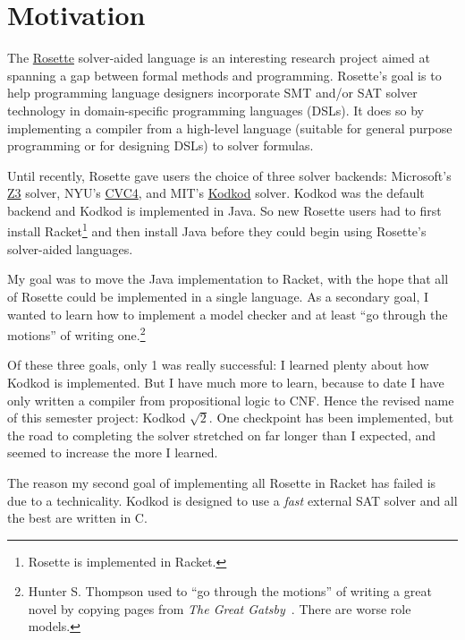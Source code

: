 \section{Motivation}
\label{sec:motivation}

The \href{https://emina.github.io/rosette/}{Rosette} solver-aided language
 is an interesting research project aimed at spanning a gap between formal
 methods and programming.
Rosette's goal is to help programming language designers incorporate
 SMT and/or SAT solver technology in domain-specific programming languages (DSLs).
It does so by implementing a compiler from a high-level language (suitable
 for general purpose programming or for designing DSLs) to solver formulas.

Until recently, Rosette gave users the choice of three solver backends:
 Microsoft's \href{https://github.com/Z3Prover/z3/wiki}{Z3} solver,
 NYU's \href{http://cvc4.cs.nyu.edu/web/}{CVC4},
 and MIT's \href{http://alloy.mit.edu/kodkod/index.html}{Kodkod} solver.
Kodkod was the default backend and Kodkod is implemented in Java.
So new Rosette users had to first install Racket\footnote{Rosette is implemented in Racket.}
 and then install Java before they could begin using Rosette's solver-aided languages.

My goal was to move the Java implementation to Racket, with the hope that
 all of Rosette could be implemented in a single language.
As a secondary goal, I wanted to learn how to implement a model checker
 and at least ``go through the motions'' of writing one.\footnote{Hunter S. Thompson used to ``go through the motions'' of writing a great novel by copying pages from \emph{The Great Gatsby}~\cite{ny}. There are worse role models.}

Of these three goals, only 1 was really successful:
 I learned plenty about how Kodkod is implemented.
But I have much more to learn, because to date I have only written a compiler from
 propositional logic to CNF.
Hence the revised name of this semester project: Kodkod $\sqrt{2}$.
One checkpoint has been implemented, but the road to completing the solver
 stretched on far longer than I expected, and seemed to increase the more I
 learned.

The reason my second goal of implementing all Rosette in Racket has failed is
 due to a technicality.
Kodkod is designed to use a \emph{fast} external SAT solver and all the best
 are written in C.


